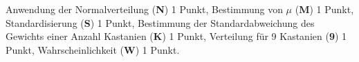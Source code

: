 \begin{bewertung}
Anwendung der Normalverteilung ({\bf N}) 1 Punkt,
Bestimmung von $\mu$ ({\bf M}) 1 Punkt,
Standardisierung ({\bf S}) 1 Punkt,
Bestimmung der Standardabweichung des Gewichts einer Anzahl Kastanien ({\bf K}) 1 Punkt,
Verteilung für 9 Kastanien ({\bf 9}) 1 Punkt,
Wahrscheinlichkeit ({\bf W}) 1 Punkt.
\end{bewertung}



